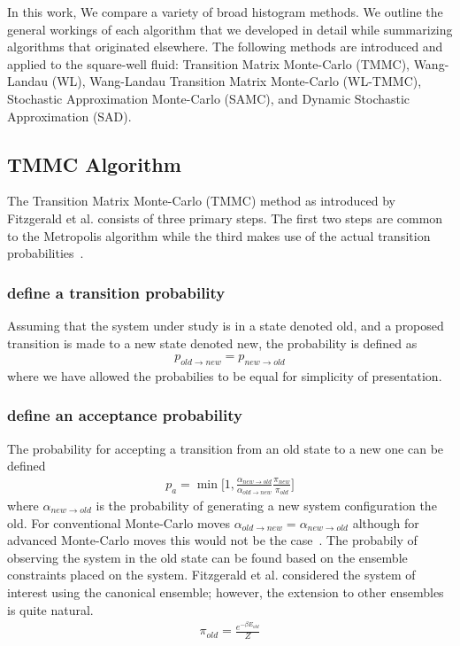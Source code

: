 \documentclass[letterpaper,twocolumn,amsmath,amssymb,pre,aps,10pt]{revtex4-1}
\begin{document}
In this work, We compare a variety of broad histogram methods.  We
outline the general workings of each algorithm that we developed in
detail while summarizing algorithms that originated elsewhere.  The
following methods are introduced and applied to the square-well fluid:
Transition Matrix Monte-Carlo (TMMC), Wang-Landau (WL), Wang-Landau
Transition Matrix Monte-Carlo (WL-TMMC), Stochastic Approximation
Monte-Carlo (SAMC), and Dynamic Stochastic Approximation
(SAD).

\subsection{TMMC Algorithm}
The Transition Matrix Monte-Carlo (TMMC) method as introduced by
Fitzgerald et al. consists of three primary steps.  The first two steps
are common to the Metropolis algorithm while the third makes use of the
actual transition probabilities~\cite{fitzgerald2000monte}.

\subsubsection{define a transition probability}
Assuming that the system under study is in a state denoted old, and a
proposed transition is made to a new state denoted new, the probability
is defined as
\begin{align}
  p_{old \rightarrow new} = p_{new \rightarrow old}
\end{align}
where we have allowed the probabilies to be equal for simplicity of
presentation.

\subsubsection{define an acceptance probability}
The probability for accepting a transition from an old state to a new
one can be defined
\begin{align}
  p_{a} = \min\bigg[1,\frac{\alpha_{new\rightarrow old}}
  {\alpha_{old \rightarrow new}}\frac{\pi_{new}}{\pi_{old}}\bigg]
\end{align}
where $\alpha_{new\rightarrow old}$ is the probability of generating a
new system configuration the old.  For conventional Monte-Carlo moves
$\alpha_{old \rightarrow new} =\alpha_{new\rightarrow old}$ although
for advanced Monte-Carlo moves this would not be the
case~\cite{paluch2008comparing, siepmann1990method}.  The probabily of
observing the system in the old state can be found based on the
ensemble constraints placed on the system.  Fitzgerald et al.
considered the system of interest using the canonical ensemble;
however, the extension to other ensembles is quite natural.
\begin{align}
  \pi_{old} = \frac{e^{-\beta E_{old}}}{Z}
\end{align}
\end{document}
